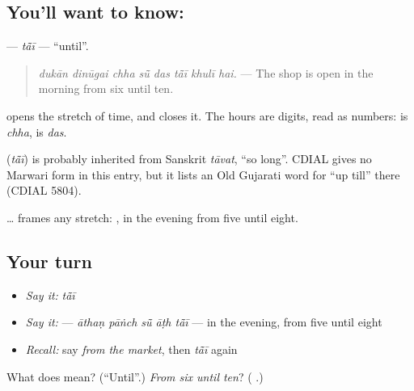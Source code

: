 \subsection*{You'll want to know: }
\textbf{} — \emph{tā̃ī} — \textquotedblleft{}until\textquotedblright{}.

\begin{quote}
\textbf{       }
\end{quote}

\begin{quote}
\emph{dukān dinūgai chha sū̃ das tā̃ī khulī hai.} — The shop is open in the morning from six until ten.
\end{quote}

\textbf{} opens the stretch of time, and \textbf{} closes it. The hours are digits, read as numbers: \textbf{} is \emph{chha}, \textbf{} is \emph{das}.

\begin{cousinweb}
\textbf{} (\emph{tā̃ī}) is probably inherited from Sanskrit \emph{tāvat}, \textquotedblleft{}so long\textquotedblright{}. CDIAL gives no Marwari form in this entry, but it lists an Old Gujarati word for \textquotedblleft{}up till\textquotedblright{} there (CDIAL 5804).
\end{cousinweb}

\begin{grammarlens}[title={What you've built}]
\textbf{} … \textbf{} frames any stretch: \textbf{    }, in the evening from five until eight.
\end{grammarlens}

\subsection*{Your turn}
\begin{itemize}
\raggedright
  \item \emph{Say it:} \emph{tā̃ī}
  \item \emph{Say it:} \textbf{    } — \emph{āthaṇ pāṅch sū̃ āṭh tā̃ī} — in the evening, from five until eight
  \item \emph{Recall:} say \emph{from the market}, then \emph{tā̃ī} again
\end{itemize}

\begin{tcolorbox}[breakable,colback=teal!4,colframe=teal!35!black,title={Before you move on}]
What does \textbf{} mean? (\textquotedblleft{}Until\textquotedblright{}.) \emph{From six until ten}? (\textbf{   }.)
\end{tcolorbox}
